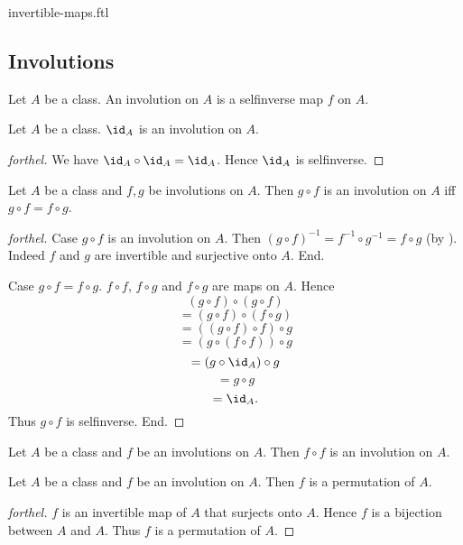 \documentclass{naproche-library}
\begin{document}
\begin{smodule}{invertible-maps.ftl}
  \subsection*{Involutions}

  \begin{definition}[forthel,id=FOUNDATIONS_09_7282039688527872,printid]
    Let $A$ be a class.
    An involution on $A$ is a selfinverse map $f$ on $A$.
  \end{definition}

  \begin{proposition}[forthel,id=FOUNDATIONS_09_7944474185433088,printid]
    Let $A$ be a class.
    $\id_{A}$ is an involution on $A$.
  \end{proposition}
  \begin{proof}[forthel]
    We have $\id_{A} \circ \id_{A} = \id_{A}$.
    Hence $\id_{A}$ is selfinverse.
  \end{proof}

  \begin{proposition}[forthel,id=FOUNDATIONS_09_6897019612299264,printid]
    Let $A$ be a class and $f, g$ be involutions on $A$.
    Then $g \circ f$ is an involution on $A$ iff $g \circ f = f \circ g$.
  \end{proposition}
  \begin{proof}[forthel]
    Case $g \circ f$ is an involution on $A$.
      Then $(g \circ f)^{-1}
        = f^{-1} \circ g^{-1}
        = f \circ g$
      (by ).
      Indeed $f$ and $g$ are invertible and surjective onto $A$.
    End.

    Case $g \circ f = f \circ g$.
      $f \circ f$, $f \circ g$ and $f \circ g$ are maps on $A$.
      Hence
      \[  (g \circ f) \circ (g \circ f)       \]
      \[    = (g \circ f) \circ (f \circ g)   \]
      \[    = ((g \circ f) \circ f) \circ g   \]
      \[    = (g \circ (f \circ f)) \circ g   \]
      \[    = (g \circ \id_{A}) \circ g       \]
      \[    = g \circ g                       \]
      \[    = \id_{A}.                        \]
      Thus $g \circ f$ is selfinverse.
    End.
  \end{proof}

  \begin{corollary}[forthel,id=FOUNDATIONS_09_5958206868160512,printid]
    Let $A$ be a class and $f$ be an involutions on $A$.
    Then $f \circ f$ is an involution on $A$.
  \end{corollary}

  \begin{proposition}[forthel,id=FOUNDATIONS_09_2314262743613440,printid]
    Let $A$ be a class and $f$ be an involution on $A$.
    Then $f$ is a permutation of $A$.
  \end{proposition}
  \begin{proof}[forthel]
    $f$ is an invertible map of $A$ that surjects onto $A$.
    Hence $f$ is a bijection between $A$ and $A$.
    Thus $f$ is a permutation of $A$.
  \end{proof}
\end{smodule}
\end{document}

